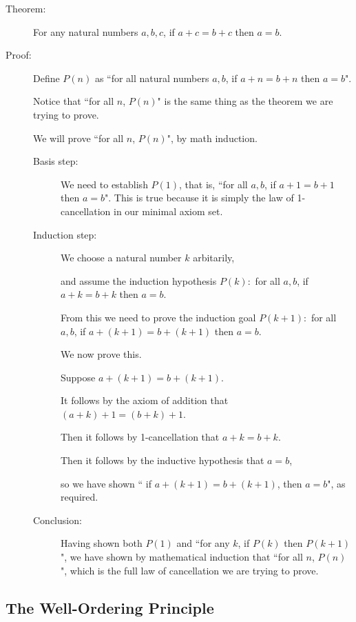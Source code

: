 \documentclass[12pt]{article}
\begin{document}
\begin{description}

\item[Theorem:]  For any natural numbers $a,b,c$, if $a+c=b+c$ then $a=b$.

\item[Proof:]  Define $P(n)$ as ``for all natural numbers $a,b$, if $a+n=b+n$ then $a=b$".

Notice that ``for all $n$, $P(n)$" is the same thing as the theorem we are trying to prove.

We will prove ``for all $n$, $P(n)$", by math induction.

\begin{description}

\item[Basis step:]  We need to establish $P(1)$, that is, ``for all $a,b$, if $a+1=b+1$ then $a=b$".  This is true because it is simply the law of 1-cancellation in our minimal axiom set.

\item[Induction step:]  We choose a natural number $k$ arbitarily,

and assume the induction hypothesis $P(k):$  for all $a,b$, if $a+k=b+k$ then $a=b$.

From this we need to prove the induction goal $P(k+1):$  for all $a,b$, if $a+(k+1) = b+(k+1)$ then $a=b$.

We now prove this.  

Suppose $a+(k+1)=b+(k+1)$. 

 It follows by the axiom of addition that $(a+k)+1 = (b+k)+1$.

Then it follows by 1-cancellation that $a+k=b+k$.

Then it follows by the inductive hypothesis that $a=b$, 

so we have shown `` if $a+(k+1)=b+(k+1)$, then $a=b$", as required.

\item[Conclusion:]  Having shown both $P(1)$ and ``for any $k$, if $P(k)$ then $P(k+1)$", we have shown by mathematical induction
that ``for all $n$, $P(n)$", which is the full law of cancellation we are trying to prove.

\end{description}

\end{description}

\subsection{The Well-Ordering Principle}
\end{document}
